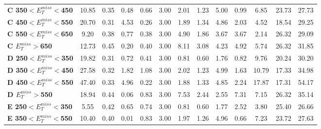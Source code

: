\begin{table}[h]
\begin{center}
{\begin{tabular}{|l|ccccccccccc|c|}
\textbf{ C 350$<E_T^{miss}<$450}         & 10.85         & 0.35          & 0.48          & 0.66          & 3.00          & 2.01          & 1.23          & 5.00          & 0.99          & 6.85          & 23.73         & 27.73         \\
\textbf{ C 450$<E_T^{miss}<$550}         & 20.70         & 0.31          & 4.53          & 0.26          & 3.00          & 1.89          & 1.34          & 4.86          & 2.03          & 4.52          & 18.54         & 29.25         \\
\textbf{ C 550$<E_T^{miss}<$650}         & 9.20          & 0.38          & 0.77          & 0.38          & 3.00          & 4.90          & 1.86          & 3.67          & 3.67          & 2.14          & 26.32         & 29.09         \\
\textbf{ C $E_T^{miss}>$650}    & 12.73         & 0.45          & 0.20          & 0.40          & 3.00          & 8.11          & 3.08          & 4.23          & 4.92          & 5.74          & 26.32         & 31.85         \\
\textbf{ D 250$<E_T^{miss}<$350}         & 19.82         & 0.31          & 0.72          & 0.41          & 3.00          & 0.81          & 0.60          & 1.76          & 0.82          & 9.76          & 20.24         & 30.20         \\
\textbf{ D 350$<E_T^{miss}<$450}         & 27.58         & 0.32          & 1.82          & 1.08          & 3.00          & 2.02          & 1.23          & 4.99          & 1.63          & 10.79         & 17.33         & 34.98         \\
\textbf{ D 450$<E_T^{miss}<$550}         & 47.40         & 0.33          & 4.96          & 0.22          & 3.00          & 1.88          & 1.33          & 4.85          & 2.24          & 17.87         & 17.31         & 54.17         \\
\textbf{ D $E_T^{miss}>$550}    & 18.94         & 0.44          & 0.06          & 0.83          & 3.00          & 7.53          & 2.44          & 2.55          & 7.31          & 7.15          & 26.32         & 35.14         \\
\textbf{ E 250$<E_T^{miss}<$350}         & 5.55          & 0.42          & 0.65          & 0.74          & 3.00          & 0.81          & 0.60          & 1.77          & 2.52          & 3.80          & 25.40         & 26.66         \\
\textbf{ E 350$<E_T^{miss}<$550}         & 10.40         & 0.40          & 0.01          & 0.83          & 3.00          & 1.97          & 1.26          & 4.96          & 0.66          & 7.23          & 23.72         & 27.63         \\

\end{tabular}}
\end{center}
\end{table}
